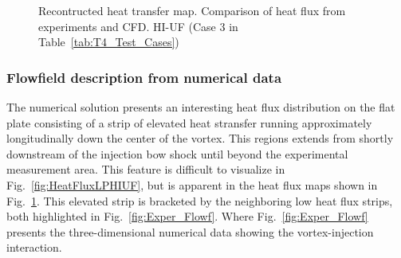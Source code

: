 \documentclass{AIAA}
\begin{document}
\begin{figure}[!h]
\center
\begin{adjustbox}{max width=1.1\columnwidth,center}
%
\end{adjustbox}
\caption{Recontructed heat transfer map. Comparison of heat flux from experiments and CFD. HI-UF (Case 3 in Table~\ref{tab:T4_Test_Cases})}
\label{fig:HeatFluxMap}
\end{figure} 


\subsubsection{Flowfield description from numerical data}

The numerical solution presents an interesting heat flux distribution on the flat plate consisting of a strip of elevated heat stransfer running approximately longitudinally down the center of the vortex.
This regions extends from shortly downstream of the injection bow shock until beyond the experimental measurement area.
This feature is difficult to visualize in Fig.~\ref{fig:HeatFluxLPHIUF}, but is apparent in the heat flux maps shown in Fig.~\ref{fig:HeatFluxMap}.
This elevated strip is bracketed by the neighboring low heat flux strips, both highlighted in Fig.~\ref{fig:Exper_Flowf}.
Where Fig.~\ref{fig:Exper_Flowf} presents the three-dimensional numerical data showing the vortex-injection interaction. 
\end{document}
